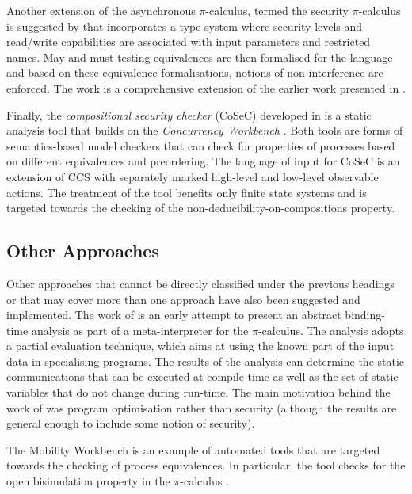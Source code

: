 \documentclass[10pt,a4paper,final,oneside,fleqn]{book}
\begin{document}
Another extension of the asynchronous $\pi$-calculus, termed the security $\pi$-calculus is suggested by \cite{hennessy4} that incorporates a type system where security levels and read/write capabilities are associated with input parameters and restricted names.  May and must testing equivalences are then formalised for the language and based on these equivalence formalisations, notions of non-interference are enforced.  The work is a comprehensive extension of the earlier work presented in \cite{hennessy2}.

Finally, the {\itshape compositional security checker\/} (CoSeC) developed in \cite{focardi6} is a static analysis tool that builds on the {\itshape Concurrency Workbench\/} \cite{cleaveland1}.  Both tools are forms of semantics-based model checkers that can check for properties of processes based on different equivalences and preordering.  The language of input for CoSeC is an extension of CCS with separately marked high-level and low-level observable actions.  The treatment of the tool benefits only finite state systems and is targeted towards the checking of the non-deducibility-on-compositions property.
 
\subsection{Other Approaches}
Other approaches that cannot be directly classified under the previous headings or that may cover more than one approach have also been suggested and implemented.  The work of \cite{gengler1} is an early attempt to present an abstract binding-time analysis as part of a meta-interpreter for the $\pi$-calculus.  The analysis adopts a partial evaluation technique, which aims at using the known part of the input data in specialising programs.  The results of the analysis can determine the static communications that can be executed at compile-time as well as the set of static variables that do not change during run-time.  The main motivation behind the work of \cite{gengler1} was program optimisation rather than security (although the results are general enough to include some notion of security).

The Mobility Workbench \cite{victor1} is an example of automated tools that are targeted towards the checking of process equivalences.  In particular, the tool checks for the open bisimulation property in the $\pi$-calculus \cite{sangiorgi1}.
\end{document}
